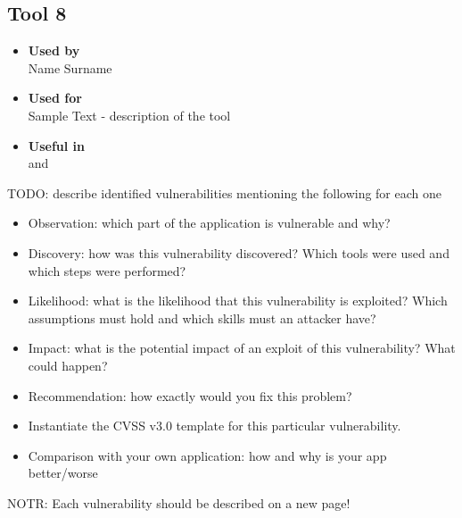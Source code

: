 \subsection*{Tool 8}
\begin{itemize}
	\item \textbf{Used by}\\ Name Surname
	\item \textbf{Used for}\\ Sample Text - description of the tool
	\item \textbf{Useful in}\\  and 
\end{itemize}

\clearpage

TODO:\newline
describe identified vulnerabilities mentioning the following for each one
\begin{itemize}
	\item Observation: which part of the application is vulnerable and why?
	\item Discovery: how was this vulnerability discovered? Which tools were used and which steps were performed?
	\item Likelihood: what is the likelihood that this vulnerability is exploited? Which assumptions must hold and which skills must an attacker have?
	\item Impact: what is the potential impact of an exploit of this vulnerability? What could happen?
	\item Recommendation: how exactly would you fix this problem?
	\item Instantiate the CVSS v3.0 template for this particular vulnerability.
	\item Comparison with your own application: how and why is your app better/worse
\end{itemize}

NOTR: Each vulnerability should be described on a new page!\newline

